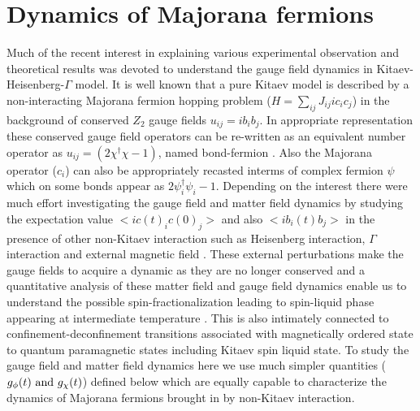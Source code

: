 \documentclass[aps,amsmath,twocolumn,amssymb,floatfix,showpacs,superscriptaddress,nofootinbib,longbibliography]{revtex4-1}
\begin{document}
\indent

\section{Dynamics of Majorana fermions}
\label{majodynamic}
Much of the recent interest in explaining various experimental observation and theoretical results was devoted to understand the gauge field dynamics in Kitaev-Heisenberg-$\Gamma$ model. It is well known that a pure Kitaev model is described by a non-interacting Majorana fermion hopping problem ($H= \sum_{ij} J_{ij} i c_i c_j $) in the background of conserved $Z_2$ gauge fields $u_{ij}= ib_i b_j$. In appropriate representation these conserved  gauge field operators can be re-written as an equivalent number operator as $u_{ij}= (2 \chi^{\dagger} \chi -1 )$, named bond-fermion \cite{mandaljpa}. Also the Majorana operator ($c_i$)  can also be appropriately recasted interms of complex fermion $\psi$ which on some bonds  appear as $2 \psi^{\dagger}_i \psi_i-1$. Depending on the interest there were much effort  investigating the gauge field and matter field dynamics by studying the expectation value $<i c(t)_i c(0)_j>$ and also $<i b_i(t)b_j>$ in the presence of other non-Kitaev interaction such as Heisenberg interaction, $\Gamma$ interaction and external magnetic field \cite{knolle-2018,nasu-motome-2019}. These external perturbations make the gauge fields to acquire a dynamic as they are no longer conserved and a quantitative analysis of these matter field and gauge field dynamics enable us to understand the possible spin-fractionalization leading to spin-liquid phase appearing at intermediate temperature \cite{berke-prb-2020,nasu-motome-2015,koga-nasu-2019,li-2021-ncom}. This is also intimately connected to confinement-deconfinement transitions associated with magnetically ordered state to quantum paramagnetic states including Kitaev spin liquid state. To study the gauge field and matter field dynamics here we use  much simpler quantities ($g_{\phi}(t)~ {\rm and}~ g_{\chi}(t) $) defined below which are equally capable  to characterize  the dynamics of Majorana fermions brought in  by non-Kitaev interaction. 
\end{document}
